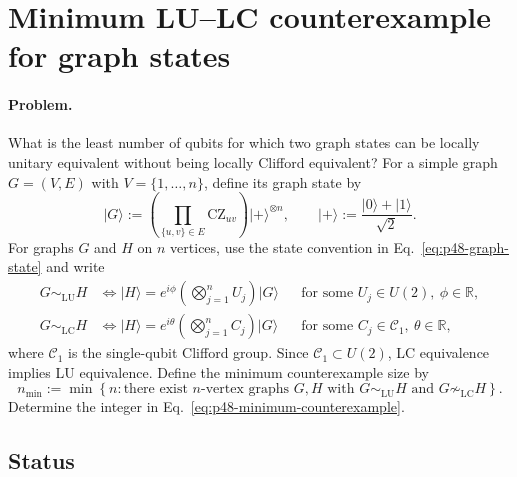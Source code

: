 \section{Minimum LU--LC counterexample for graph states}
\label{sec:problem-48}

\paragraph{Problem.}
What is the least number of qubits for which two graph states can be locally
unitary equivalent without being locally Clifford equivalent?  For a simple
graph $G=(V,E)$ with $V=\{1,\ldots,n\}$, define its graph state by
\begin{equation}
  \lvert G\rangle
  :=\left(\prod_{\{u,v\}\in E}\mathrm{CZ}_{uv}\right)
    \lvert+\rangle^{\otimes n},
  \qquad
  \lvert+\rangle:=\frac{\lvert0\rangle+\lvert1\rangle}{\sqrt2}.
  \label{eq:p48-graph-state}
\end{equation}
For graphs $G$ and $H$ on $n$ vertices, use the state convention in
Eq.~\eqref{eq:p48-graph-state} and write
\begin{equation}
  \begin{aligned}
    G\sim_{\mathrm{LU}}H
    &\iff
      \lvert H\rangle=e^{i\phi}
      \left(\bigotimes_{j=1}^{n}U_j\right)\lvert G\rangle
      &&\text{for some }U_j\in U(2),\ \phi\in\mathbb R,\\
    G\sim_{\mathrm{LC}}H
    &\iff
      \lvert H\rangle=e^{i\theta}
      \left(\bigotimes_{j=1}^{n}C_j\right)\lvert G\rangle
      &&\text{for some }C_j\in\mathcal C_1,\ \theta\in\mathbb R,
  \end{aligned}
  \label{eq:p48-lu-lc-equivalence}
\end{equation}
where $\mathcal C_1$ is the single-qubit Clifford group.  Since
$\mathcal C_1\subset U(2)$, LC equivalence implies LU equivalence.  Define the
minimum counterexample size by
\begin{equation}
  n_{\min}
  :=\min\left\{n:\text{there exist $n$-vertex graphs $G,H$ with
  $G\sim_{\mathrm{LU}}H$ and $G\not\sim_{\mathrm{LC}}H$}\right\}.
  \label{eq:p48-minimum-counterexample}
\end{equation}
Determine the integer in Eq.~\eqref{eq:p48-minimum-counterexample}.

\subsection*{Status}

